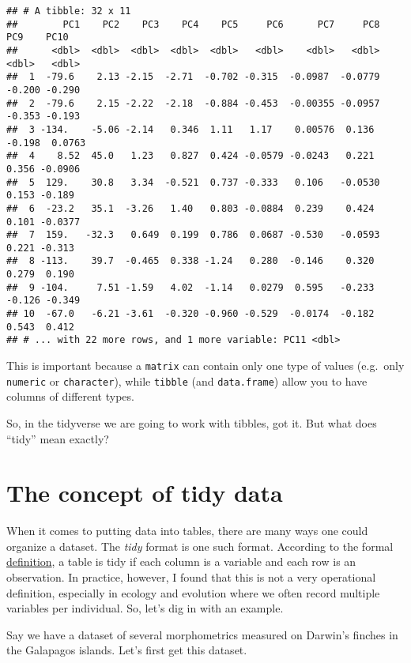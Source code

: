 \documentclass[
]{book}
\begin{document}
\begin{verbatim}
## # A tibble: 32 x 11
##        PC1    PC2    PC3    PC4    PC5     PC6      PC7     PC8    PC9    PC10
##      <dbl>  <dbl>  <dbl>  <dbl>  <dbl>   <dbl>    <dbl>   <dbl>  <dbl>   <dbl>
##  1  -79.6    2.13 -2.15  -2.71  -0.702 -0.315  -0.0987  -0.0779 -0.200 -0.290 
##  2  -79.6    2.15 -2.22  -2.18  -0.884 -0.453  -0.00355 -0.0957 -0.353 -0.193 
##  3 -134.    -5.06 -2.14   0.346  1.11   1.17    0.00576  0.136  -0.198  0.0763
##  4    8.52  45.0   1.23   0.827  0.424 -0.0579 -0.0243   0.221   0.356 -0.0906
##  5  129.    30.8   3.34  -0.521  0.737 -0.333   0.106   -0.0530  0.153 -0.189 
##  6  -23.2   35.1  -3.26   1.40   0.803 -0.0884  0.239    0.424   0.101 -0.0377
##  7  159.   -32.3   0.649  0.199  0.786  0.0687 -0.530   -0.0593  0.221 -0.313 
##  8 -113.    39.7  -0.465  0.338 -1.24   0.280  -0.146    0.320   0.279  0.190 
##  9 -104.     7.51 -1.59   4.02  -1.14   0.0279  0.595   -0.233  -0.126 -0.349 
## 10  -67.0   -6.21 -3.61  -0.320 -0.960 -0.529  -0.0174  -0.182   0.543  0.412 
## # ... with 22 more rows, and 1 more variable: PC11 <dbl>
\end{verbatim}

This is important because a \texttt{matrix} can contain only one type of values (e.g.~only \texttt{numeric} or \texttt{character}), while \texttt{tibble} (and \texttt{data.frame}) allow you to have columns of different types.

So, in the tidyverse we are going to work with tibbles, got it. But what does ``tidy'' mean exactly?

\hypertarget{the-concept-of-tidy-data}{%
\section{The concept of tidy data}\label{the-concept-of-tidy-data}}

When it comes to putting data into tables, there are many ways one could organize a dataset. The \emph{tidy} format is one such format. According to the formal \href{https://tidyr.tidyverse.org/articles/tidy-data.html}{definition}, a table is tidy if each column is a variable and each row is an observation. In practice, however, I found that this is not a very operational definition, especially in ecology and evolution where we often record multiple variables per individual. So, let's dig in with an example.

Say we have a dataset of several morphometrics measured on Darwin's finches in the Galapagos islands. Let's first get this dataset.
\end{document}
